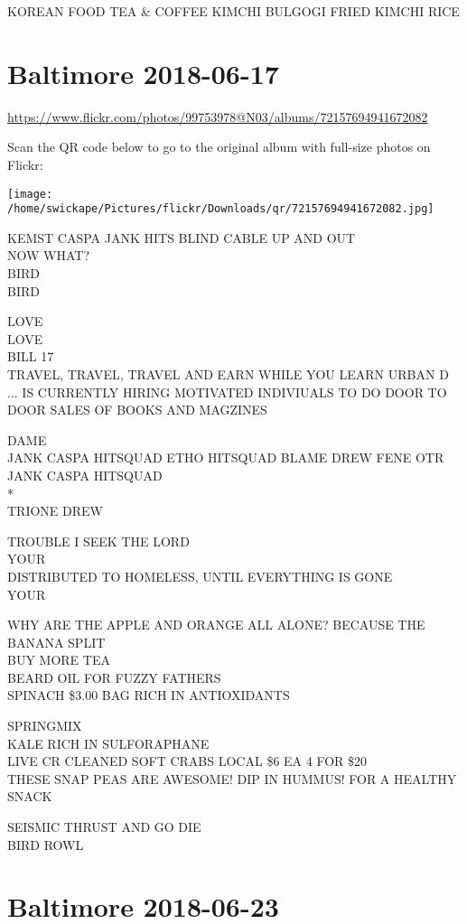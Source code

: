 \documentclass[10pt,letterpaper]{article}
\begin{document}
KOREAN FOOD TEA \& COFFEE KIMCHI BULGOGI FRIED KIMCHI RICE


\section*{Baltimore 2018-06-17}

\url{https://www.flickr.com/photos/99753978@N03/albums/72157694941672082}

Scan the QR code below to go to the original album with full-size photos on Flickr:

\texttt{[image: /home/swickape/Pictures/flickr/Downloads/qr/72157694941672082.jpg]}


KEMST CASPA JANK HITS BLIND CABLE UP AND OUT\\
NOW WHAT?\\
BIRD\\
BIRD

LOVE\\
LOVE\\
BILL 17\\
TRAVEL, TRAVEL, TRAVEL AND EARN WHILE YOU LEARN URBAN D ... IS CURRENTLY HIRING MOTIVATED INDIVIUALS TO DO DOOR TO DOOR SALES OF BOOKS AND MAGZINES

DAME\\
JANK CASPA HITSQUAD ETHO HITSQUAD BLAME DREW FENE OTR JANK CASPA HITSQUAD\\
*\\
TRIONE DREW

TROUBLE I SEEK THE LORD\\
YOUR\\
DISTRIBUTED TO HOMELESS, UNTIL EVERYTHING IS GONE\\
YOUR

WHY ARE THE APPLE AND ORANGE ALL ALONE?  BECAUSE THE BANANA SPLIT\\
BUY MORE TEA\\
BEARD OIL FOR FUZZY FATHERS\\
SPINACH \$3.00 BAG RICH IN ANTIOXIDANTS

SPRINGMIX\\
KALE RICH IN SULFORAPHANE\\
LIVE CR CLEANED SOFT CRABS LOCAL \$6 EA 4 FOR \$20\\
THESE SNAP PEAS ARE AWESOME!  DIP IN HUMMUS!  FOR A HEALTHY SNACK

SEISMIC THRUST AND GO DIE\\
BIRD ROWL


\section*{Baltimore 2018-06-23}
\end{document}
